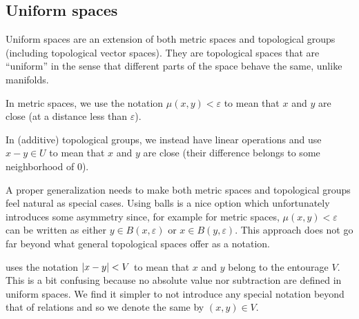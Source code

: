 \subsection{Uniform spaces}\label{subsec:uniform_spaces}

\begin{remark}\label{remark:entourage_notation}
  Uniform spaces are an extension of both metric spaces and topological groups (including topological vector spaces). They are topological spaces that are \enquote{uniform} in the sense that different parts of the space behave the same, unlike manifolds.

  In metric spaces, we use the notation \( \mu(x, y) < \varepsilon \) to mean that \( x \) and \( y \) are close (at a distance less than \( \varepsilon \)).

  In (additive) topological groups, we instead have linear operations and use \( x - y \in U \) to mean that \( x \) and \( y \) are close (their difference belongs to some neighborhood of \( 0 \)).

  A proper generalization needs to make both metric spaces and topological groups feel natural as special cases. Using balls is a nice option which unfortunately introduces some asymmetry since, for example for metric spaces, \( \mu(x, y) < \varepsilon \) can be written as either \( y \in B(x, \varepsilon) \) or \( x \in B(y, \varepsilon) \). This approach does not go far beyond what general topological spaces offer as a notation.

  \cite[section 8]{Engelking1989} uses the notation \( \left\vert x - y \right\vert < V \) to mean that \( x \) and \( y \) belong to the entourage \( V \). This is a bit confusing because no absolute value nor subtraction are defined in uniform spaces. We find it simpler to not introduce any special notation beyond that of relations and so we denote the same by \( (x, y) \in V \).
\end{remark}


